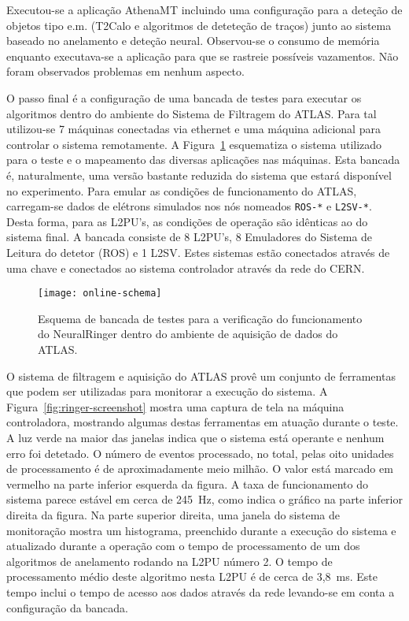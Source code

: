 Executou-se a aplicação AthenaMT incluindo uma configuração para a deteção de
objetos tipo e.m. (T2Calo e algoritmos de deteteção de traços) junto ao
sistema baseado no anelamento e deteção neural. Observou-se o consumo de
memória enquanto executava-se a aplicação para que se rastreie possíveis
vazamentos. Não foram observados problemas em nenhum aspecto.

O passo final é a configuração de uma bancada de testes para executar os
algoritmos dentro do ambiente do Sistema de Filtragem do ATLAS. Para tal
utilizou-se 7 máquinas conectadas via  ethernet e uma máquina
adicional para controlar o sistema remotamente.  A
Figura~\ref{fig:online-schema} esquematiza o sistema utilizado para o teste e
o mapeamento das diversas aplicações nas máquinas. Esta bancada é,
naturalmente, uma versão bastante reduzida do sistema que estará disponível no
experimento. Para emular as condições de funcionamento do ATLAS, carregam-se
dados de elétrons simulados nos nós nomeados \texttt{ROS-*} e
\texttt{L2SV-*}. Desta forma, para as L2PU's, as condições de operação são
idênticas ao do sistema final. A bancada consiste de 8 L2PU's, 8 Emuladores do
Sistema de Leitura do detetor (ROS) e 1 L2SV. Estes sistemas estão conectados
através de uma chave  e conectados ao sistema
controlador através da rede do CERN.

\begin{figure}
\begin{center}
\texttt{[image: online-schema]}
\end{center}
\caption{Esquema de bancada de testes para a verificação do funcionamento do
NeuralRinger dentro do ambiente de aquisição de dados do ATLAS.}
\label{fig:online-schema}
\end{figure}

O sistema de filtragem e aquisição do ATLAS provê um conjunto de ferramentas
que podem ser utilizadas para monitorar a execução do sistema. A
Figura~\ref{fig:ringer-screenshot} mostra uma captura de tela na máquina
controladora, mostrando algumas destas ferramentas em atuação durante o
teste. A luz verde na maior das janelas indica que o sistema está operante e
nenhum erro foi detetado. O número de eventos processado, no total, pelas oito
unidades de processamento é de aproximadamente meio milhão. O valor está
marcado em vermelho na parte inferior esquerda da figura. A taxa de
funcionamento do sistema parece estável em cerca de 245~Hz, como indica o
gráfico na parte inferior direita da figura. Na parte superior direita, uma
janela do sistema de monitoração  mostra um histograma, preenchido
durante a execução do sistema e atualizado durante a operação com o tempo de
processamento de um dos algoritmos de anelamento rodando na L2PU número 2. O
tempo de processamento médio deste algoritmo nesta L2PU é de cerca de
3,8~ms. Este tempo inclui o tempo de acesso aos dados através da rede
 levando-se em conta a configuração da bancada.

